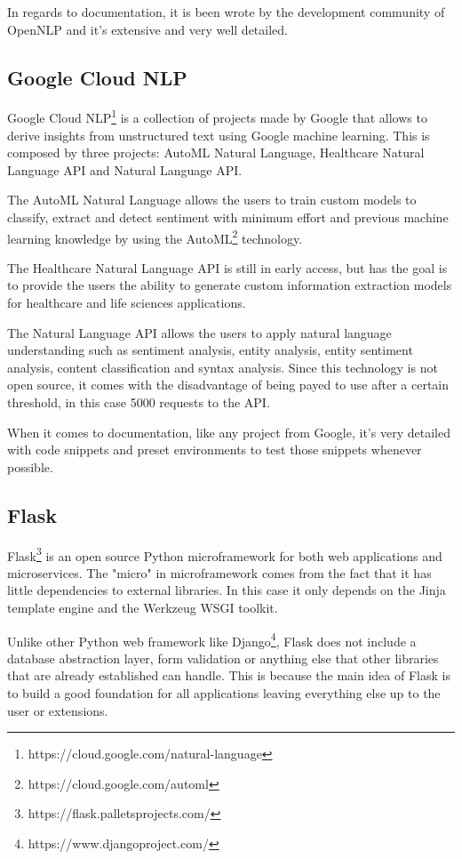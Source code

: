 In regards to documentation, it is been wrote by the development community of OpenNLP and it's extensive and very well detailed.

\subsection{Google Cloud NLP}

Google Cloud NLP\footnote{https://cloud.google.com/natural-language} is a collection of projects made by Google that allows to derive insights from unstructured text using Google machine learning.
This is composed by three projects: AutoML Natural Language, Healthcare Natural Language API and Natural Language API.

The AutoML Natural Language allows the users to train custom models to classify, extract and detect sentiment with minimum effort and previous machine learning knowledge by using the AutoML\footnote{https://cloud.google.com/automl} technology.

The Healthcare Natural Language API is still in early access, but has the goal is to provide the users the ability to generate custom information extraction models for healthcare and life sciences applications.

The Natural Language API allows the users to apply natural language understanding such as sentiment analysis, entity analysis, entity sentiment analysis, content classification and syntax analysis.
Since this technology is not open source, it comes with the disadvantage of being payed to use after a certain threshold, in this case 5000 requests to the API.

When it comes to documentation, like any project from Google, it's very detailed with code snippets and preset environments to test those snippets whenever possible.

\subsection{Flask}

Flask\footnote{https://flask.palletsprojects.com/} is an open source Python microframework for both web applications and microservices.
The "micro" in microframework comes from the fact that it has little dependencies to external libraries.
In this case it only depends on the Jinja template engine and the Werkzeug WSGI toolkit\cite{flask2020Docs}.

Unlike other Python web framework like Django\footnote{https://www.djangoproject.com/}, Flask does not include a database abstraction layer, form validation or anything else that other libraries that are already established can handle.
This is because the main idea of Flask is to build a good foundation for all applications leaving everything else up to the user or extensions.

